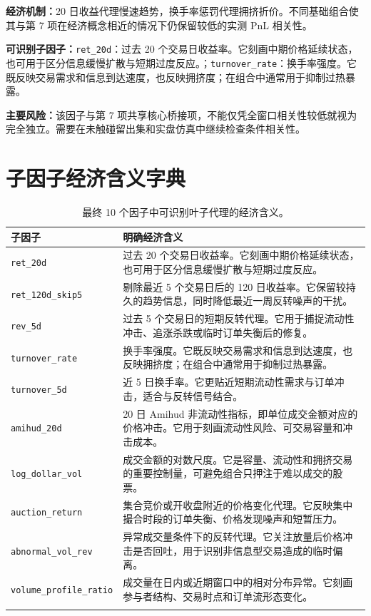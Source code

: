 \documentclass[10pt,a4paper]{article}
\begin{document}
\textbf{经济机制：}20 日收益代理慢速趋势，换手率惩罚代理拥挤折价。不同基础组合使其与第 7 项在经济概念相近的情况下仍保留较低的实测 PnL 相关性。

\textbf{可识别子因子：}\texttt{ret\_20d}：过去 20 个交易日收益率。它刻画中期价格延续状态，也可用于区分信息缓慢扩散与短期过度反应。；\texttt{turnover\_rate}：换手率强度。它既反映交易需求和信息到达速度，也反映拥挤度；在组合中通常用于抑制过热暴露。

\textbf{主要风险：}该因子与第 7 项共享核心桥接项，不能仅凭全窗口相关性较低就视为完全独立。需要在未触碰留出集和实盘仿真中继续检查条件相关性。


\section{子因子经济含义字典}
\begin{longtable}{p{3.8cm}p{12.1cm}}
\toprule
子因子 & 明确经济含义 \\
\midrule
\endhead
\texttt{ret\_20d} & 过去 20 个交易日收益率。它刻画中期价格延续状态，也可用于区分信息缓慢扩散与短期过度反应。 \\
\texttt{ret\_120d\_skip5} & 剔除最近 5 个交易日后的 120 日收益率。它保留较持久的趋势信息，同时降低最近一周反转噪声的干扰。 \\
\texttt{rev\_5d} & 过去 5 个交易日的短期反转代理。它用于捕捉流动性冲击、追涨杀跌或临时订单失衡后的修复。 \\
\texttt{turnover\_rate} & 换手率强度。它既反映交易需求和信息到达速度，也反映拥挤度；在组合中通常用于抑制过热暴露。 \\
\texttt{turnover\_5d} & 近 5 日换手率。它更贴近短期流动性需求与订单冲击，适合与反转信号结合。 \\
\texttt{amihud\_20d} & 20 日 Amihud 非流动性指标，即单位成交金额对应的价格冲击。它用于刻画流动性风险、可交易容量和冲击成本。 \\
\texttt{log\_dollar\_vol} & 成交金额的对数尺度。它是容量、流动性和拥挤交易的重要控制量，可避免组合只押注于难以成交的股票。 \\
\texttt{auction\_return} & 集合竞价或开收盘附近的价格变化代理。它反映集中撮合时段的订单失衡、价格发现噪声和短暂压力。 \\
\texttt{abnormal\_vol\_rev} & 异常成交量条件下的反转代理。它关注放量后价格冲击是否回吐，用于识别非信息型交易造成的临时偏离。 \\
\texttt{volume\_profile\_ratio} & 成交量在日内或近期窗口中的相对分布异常。它刻画参与者结构、交易时点和订单流形态变化。 \\
\bottomrule
\caption{最终 10 个因子中可识别叶子代理的经济含义。}
\end{longtable}
\end{document}
